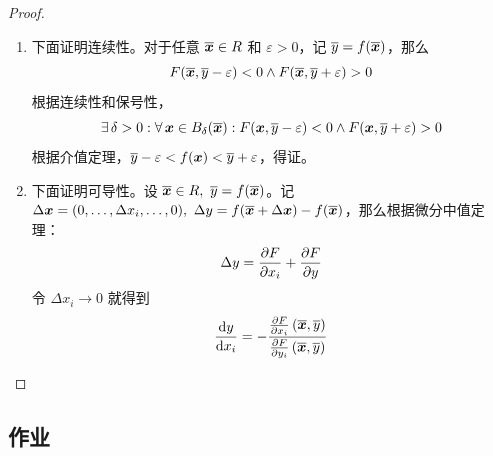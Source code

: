 \begin{theorem}[隐函数定理]
\begin{proof}
\begin{enumerate}
            \item 下面证明连续性。对于任意 $\boldsymbol{\overline{x}} \in R$ 和 $\varepsilon > 0$，记 $\overline{y} = f(\boldsymbol{\overline{x}})$，那么
            $$
            F(\boldsymbol{\overline{x}}, \overline{y} - \varepsilon) < 0 \land F(\boldsymbol{\overline{x}}, \overline{y} + \varepsilon) > 0
            $$
            根据连续性和保号性，
            $$
            \exists\,\delta > 0: \forall\,\boldsymbol{x} \in B_{\delta}(\boldsymbol{\overline{x}}): 
            F(\boldsymbol{x}, \overline{y} - \varepsilon) < 0 \land F(\boldsymbol{x}, \overline{y} + \varepsilon) > 0
            $$
            根据介值定理，$\overline{y} - \varepsilon < f(\boldsymbol{x}) < \overline{y} + \varepsilon$，得证。
            
            \item 下面证明可导性。设 $\boldsymbol{\overline{x}} \in R,\ \overline{y} = f(\boldsymbol{\overline{x}})$。记 $\Delta \boldsymbol{x} = (0, \dots, \Delta x_i, \dots, 0),\ \Delta y = f(\boldsymbol{\overline{x}} + \Delta \boldsymbol{x}) - f(\boldsymbol{\overline{x}})$，那么根据微分中值定理：
            $$
            \Delta y = \pdv{F}{x_i}(\vect{\overline{x}} + \theta \Delta \vect{x}, \overline{y} + \theta \Delta y) + \pdv{F}{y}(\vect{\overline{x}} + \theta \Delta \vect{x}, \overline{y} + \theta \Delta y)
            $$
            令 $\Delta x_i \to 0$ 就得到
            $$
            \dv{y}{x_i} = - \frac{\pdv{F}{x_i}\,(\boldsymbol{\overline{x}}, \overline{y})}{\pdv{F}{y_i}\,(\boldsymbol{\overline{x}}, \overline{y})}
            $$
        \end{enumerate}
    \end{proof}
\end{theorem}

\subsection{作业}


